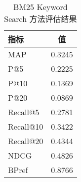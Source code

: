 \begin{table}[h]
\centering
\caption{BM25 Keyword Search 方法评估结果}
\begin{tabular}{|l|c|}
\hline
指标 & 值 \\
\hline
MAP & 0.3245 \\
P@5 & 0.2225 \\
P@10 & 0.1369 \\
P@20 & 0.0869 \\
Recall@5 & 0.2781 \\
Recall@10 & 0.3422 \\
Recall@20 & 0.4344 \\
NDCG & 0.4826 \\
BPref & 0.8766 \\
\hline
\end{tabular}
\end{table}
